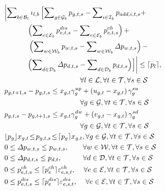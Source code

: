 \documentclass[lettersize,journal]{IEEEtran}
\begin{document}
\begin{subequations}
\begin{align}
    & \biggl | \sum\nolimits_{b\in\mathcal{B}_{l}} \iota_{l,b} \left[ \sum\nolimits_{g\in\mathcal{G}_{b}} p_{g,t,s} - \sum\nolimits_{i\in\mathcal{I}_{b}} p_{add, i,t,s} + \right. \notag \\
    & \qquad\quad\, \left(\sum\nolimits_{e\in\mathcal{E}_{b}} p_{e,t,s}^{dis} - \sum\nolimits_{e\in\mathcal{E}_{b}} p_{e,t,s}^{ch} \right) + \notag\\
    & \qquad\quad\,\,\left(\sum\nolimits_{w\in\mathcal{W}_b} p_{w,t,s} - \sum\nolimits_{w\in\mathcal{W}_b} \varDelta p_{w,t,s} \right) -\notag \\
    & \qquad\quad \left. \left( \sum\nolimits_{d\in\mathcal{D}_b} \varDelta p_{d,t,s} - \sum\nolimits_{d\in\mathcal{D}_b} p_{d,t,s}\right) \right] \biggr |  \leq \lceil p_{l} \rceil , \notag \\
    & \qquad\qquad\qquad\qquad\qquad\,\,\,\, \forall l\in\mathcal{L},\forall t\in\mathcal{T},\forall s\in\mathcal{S} \\
    & p_{g,t+1,s} - p_{g,t,s} \leq x_{g,t} \gamma_{g}^{up} + \left( u_{g,t} - x_{g,t} \right) \gamma_{g}^{su}\notag \\
    & \qquad\qquad\qquad\qquad\qquad\,\,\,\, \forall g\in\mathcal{G},\forall t\in\mathcal{T},\forall s\in\mathcal{S} \\
    & p_{g,t,s} - p_{g,t+1,s} \leq x_{g,t} \gamma_{g}^{dw} + \left( v_{g,t} - x_{g,t} \right) \gamma_{g}^{sd} \notag \\
    & \qquad\qquad\qquad\qquad\qquad\,\,\,\, \forall g\in\mathcal{G},\forall t\in\mathcal{T},\forall s\in\mathcal{S} \\
    & \lfloor p_{g} \rfloor x_{g,t} \!\leq\! p_{g,t,s} \!\leq\! \lceil p_{g} \rceil x_{g,t}, \forall g\in\mathcal{G}, \forall t\in\mathcal{T}, \forall s\in\mathcal{S}\\
    & 0 \leq \varDelta p_{w,t,s} \leq p_{w,t,s}, \quad\quad \forall w\in\mathcal{W}, \forall t\in\mathcal{T}, \forall s\in\mathcal{S}\\
    & 0 \leq \varDelta p_{d,t,s} \leq p_{d,t}, \quad\quad\quad \forall d\in\mathcal{D}, \forall t\in\mathcal{T}, \forall s\in\mathcal{S} \\
    & 0 \leq p_{e,t,s}^{ch} \leq \lceil p_{e}^{ch} \rceil  \varepsilon_{e,s,t}^{ch}, \,\quad \forall e\in\mathcal{E},\forall t\in\mathcal{T}, \forall s\in\mathcal{S}\\
    & 0 \leq p_{e,t,s}^{dis} \leq \lceil p_{e}^{dis} \rceil \varepsilon_{e,s,t}^{dis}, \,\quad \forall e\in\mathcal{E}, \forall t\in\mathcal{T}, \forall s\in\mathcal{S} \\

\end{align}
\end{subequations}
\end{document}
